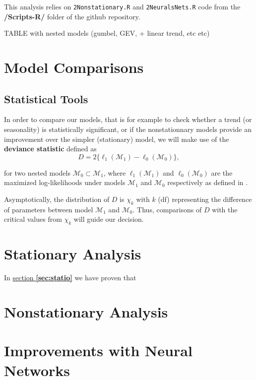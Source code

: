 
This analysis relies on \texttt{2Nonstationary.R} and \texttt{2NeuralsNets.R} code from the \textbf{/Scripts-R/} folder of the github repository.

TABLE with nested models (gumbel, GEV, + linear trend, etc etc)


\section{Model Comparisons}

\subsection{Statistical Tools}

In order to compare our models, that is for example to check whether a trend (or seasonality) is statistically significant, or if the nonstationnary models provide an improvement over the simpler (stationary) model, we will make use of the \textbf{deviance statistic} defined as 
\begin{equation}
D = 2\big\{\ell_1(\mathcal{M}_1)-\ell_0(\mathcal{M}_0)\big\},
\end{equation}

for two nested models $\mathcal{M}_0\subset \mathcal{M}_1$, where $\ell_1(\mathcal{M}_1)$ and $\ell_0(\mathcal{M}_0)$ are the maximized log-likelihoods under models $\mathcal{M}_1$ and $\mathcal{M}_0$ respectively as defined in .

Asymptotically, the distribution of $D$ is $\chi_k$ with $k$ (df) representing the difference of parameters between model $\mathcal{M}_1$ and $\mathcal{M}_0$. Thus, comparisons of $D$ with the critical values from $\chi_k$ will guide our decision.



\section{Stationary Analysis}


In \hyperref[sec:statio]{section \textbf{\ref{sec:statio}}} we have proven that 

\section{Nonstationary Analysis}

\section{Improvements with Neural Networks}